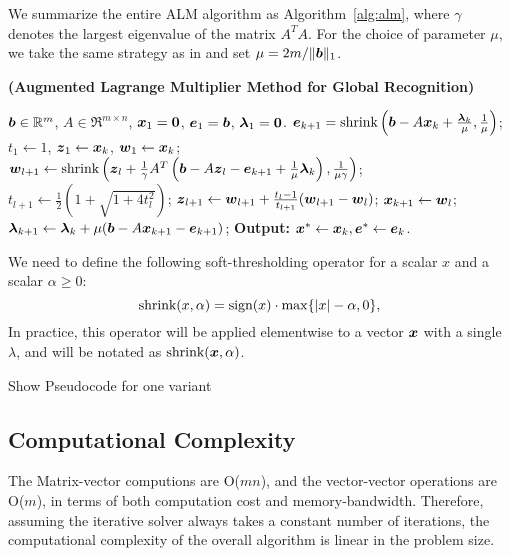 \documentclass[10pt,twocolumn,letterpaper]{article}
\begin{document}
We summarize the entire ALM
algorithm as Algorithm~\ref{alg:alm}, where $\gamma$ denotes the
largest eigenvalue of the matrix $A^TA$. For the choice of parameter $\mu$, we take the same strategy as
in \cite{YangJ2009-pp} and set $\mu = 2m / \|\boldsymbol{b}\|_1$.
\begin{algorithm}[h]
\caption{\bf (Augmented Lagrange Multiplier Method for Global
Recognition)}
\begin{algorithmic}[1]
 $\boldsymbol{b} \in \mathbb R^m$, $A \in \Re^{m \times n}$,
${\boldsymbol{x}}_1 = \boldsymbol{0}$, $\boldsymbol{e}_1 = \boldsymbol{b}$, $\boldsymbol{\lambda}_1 =
\boldsymbol{0}$.
\STATE $\boldsymbol{e}_{k+1} = \textup{shrink}\left(\boldsymbol{b} - A{\boldsymbol{x}}_k + \frac{\boldsymbol{\lambda}_k}{\mu}, \frac{1}{\mu}\right)$;
\STATE $t_1\leftarrow 1$, $\boldsymbol{z}_1 \leftarrow {\boldsymbol{x}}_k$, $\boldsymbol{w}_1 \leftarrow {\boldsymbol{x}}_k$;
\STATE $\boldsymbol{w}_{l+1} \leftarrow \textup{shrink}\left(\boldsymbol{z}_l +
\frac{1}{\gamma}A^T\left(\boldsymbol{b} - A\boldsymbol{z}_l - \boldsymbol{e}_{k+1} +
\frac{1}{\mu}\boldsymbol{\lambda}_k\right), \frac{1}{\mu\gamma}\right)$;
\STATE $t_{l+1} \leftarrow \frac{1}{2}\left( 1 +
\sqrt{1+4t_l^2}\right)$;
\STATE $\boldsymbol{z}_{l+1} \leftarrow \boldsymbol{w}_{l+1} + \frac{t_l - 1}{t_{l+1}}(\boldsymbol{w}_{l+1} - \boldsymbol{w}_l)$;
\ENDWHILE
\STATE ${\boldsymbol{x}}_{k+1} \leftarrow \boldsymbol{w}_{l}$;
\STATE $\boldsymbol{\lambda}_{k+1} \leftarrow \boldsymbol{\lambda}_k + \mu (\boldsymbol{b} - A{\boldsymbol{x}}_{k+1} - \boldsymbol{e}_{k+1})$;
\ENDWHILE \STATE
{\bf Output:} ${\boldsymbol{x}}^* \leftarrow {\boldsymbol{x}}_k, \boldsymbol{e}^* \leftarrow \boldsymbol{e}_k$.
\end{algorithmic}
\label{alg:alm}
\end{algorithm}



We need to define the following soft-thresholding operator for a
scalar $x$ and a scalar $\alpha \geq 0$:
\begin{equation}
\textup{shrink}(x,\alpha) = \textup{sign}(x)\cdot \max \{|x| - \alpha, 0\},
\end{equation}
In practice, this operator will be applied elementwise to a vector ${\boldsymbol{x}}$ with a single $\lambda$,
and will be notated as $\textup{shrink}({\boldsymbol{x}},\alpha)$.

Show Pseudocode for one variant
\subsection{Computational Complexity}
The Matrix-vector computions are O($mn$), and the vector-vector operations are O($m$), 
in terms of both computation cost and memory-bandwidth.
Therefore, assuming the iterative solver always takes a constant number of iterations,
the computational complexity of the overall algorithm is linear in the problem size.
\end{document}
